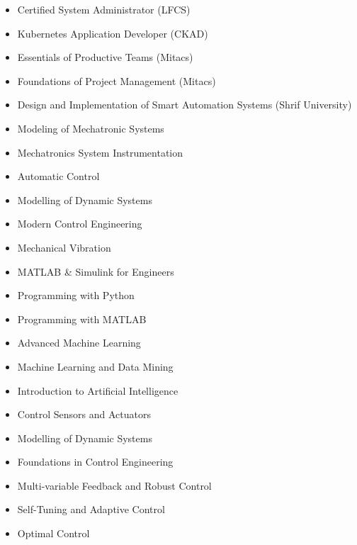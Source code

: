 \documentclass[10pt,letterpaper,ragged2e,compact]{mocv}
\begin{document}
\begin{paracol}{2}
    \divider

    \newpage
    \begin{itemize}
        \item Certified System Administrator (LFCS)  
        \item Kubernetes Application Developer (CKAD) 
        \item Essentials of Productive Teams (Mitacs)
        \item Foundations of Project Management (Mitacs)
        \item Design and Implementation of Smart Automation Systems (Shrif University)
    \end{itemize}
    \begin{itemize}
        \item Modeling of Mechatronic Systems
        \item Mechatronics System Instrumentation
        \item Automatic Control
        \item Modelling of Dynamic Systems
        \item Modern Control Engineering
        \item Mechanical Vibration
        \item MATLAB \& Simulink for Engineers
        \item Programming with Python
        \item Programming with MATLAB
    \end{itemize}
    \begin{itemize}
        \item Advanced Machine Learning
        \item Machine Learning and Data Mining
        \item Introduction to Artificial Intelligence
        \item Control Sensors and Actuators
        \item Modelling of Dynamic Systems
        \item Foundations in Control Engineering
        \item Multi-variable Feedback and Robust Control
        \item Self-Tuning and Adaptive Control
        \item Optimal Control

\end{itemize}
\end{paracol}
\end{document}
